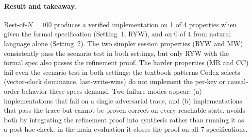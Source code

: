 \paragraph{Result and takeaway.}
Best-of-$N=100$ produces a verified implementation on 1 of 4 properties when given the formal specification (Setting~1, RYW), and on 0 of 4 from natural language alone (Setting~2). The two simpler session properties (RYW and MW) consistently pass the scenario test in both settings, but only RYW with the formal spec also passes the refinement proof. The harder properties (MR and CC) fail even the scenario test in both settings: the textbook patterns Codex selects (vector-clock dominance, last-write-wins) do not implement the per-key or causal-order behavior these specs demand. Two failure modes appear: (a) implementations that fail on a single adversarial trace, and (b) implementations that pass the trace but cannot be proven correct on every reachable state. \sys{} avoids both by integrating the refinement proof into synthesis rather than running it as a post-hoc check; in the main evaluation it closes the proof on all 7 specifications.
